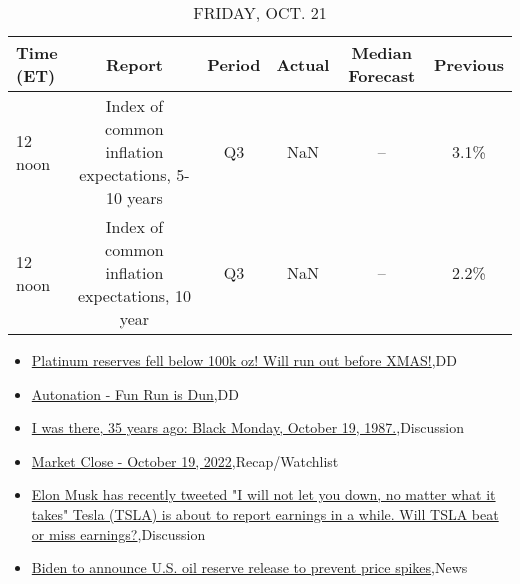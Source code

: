 \documentclass{article}%
\begin{document}
%


\begin{table}[htbp]%
\caption{FRIDAY, OCT. 21}%
\centering%
\begin{adjustbox}{width=1\textwidth}%
\begin{tabular}{lccccc}
\toprule
Time (ET) &                                             Report & Period & Actual & Median Forecast & Previous \\
\midrule
  12 noon & Index of common inflation expectations, 5-10 years &     Q3 &    NaN &              -- &     3.1\% \\
  12 noon &    Index of common inflation expectations, 10 year &     Q3 &    NaN &              -- &     2.2\% \\
\bottomrule
\end{tabular}
%
\end{adjustbox}%
\end{table}

%
\begin{itemize}%
\item%
\href{https://reddit.com/r/wallstreetbets/comments/y8nvo0/platinum\_reserves\_fell\_below\_100k\_oz\_will\_run\_out/}{Platinum reserves fell below 100k oz! Will run out before XMAS!},DD%
\item%
\href{https://reddit.com/r/Baystreetbets/comments/y8mazr/autonation\_fun\_run\_is\_dun/}{Autonation - Fun Run is Dun},DD%
\item%
\href{https://reddit.com/r/StockMarket/comments/y8dr37/i\_was\_there\_35\_years\_ago\_black\_monday\_october\_19/}{I was there, 35 years ago: Black Monday, October 19, 1987.},Discussion%
\item%
\href{https://reddit.com/r/StockMarket/comments/y8d40x/market\_close\_october\_19\_2022/}{Market Close - October 19, 2022},Recap/Watchlist%
\item%
\href{https://reddit.com/r/StockMarket/comments/y8crbq/elon\_musk\_has\_recently\_tweeted\_i\_will\_not\_let\_you/}{Elon Musk has recently tweeted "I will not let you down, no matter what it takes" Tesla (TSLA) is about to report earnings in a while. Will TSLA beat or miss earnings?},Discussion%
\item%
\href{https://reddit.com/r/Economics/comments/y88nnx/biden\_to\_announce\_us\_oil\_reserve\_release\_to/}{Biden to announce U.S. oil reserve release to prevent price spikes},News%
\end{itemize}%
\end{document}

